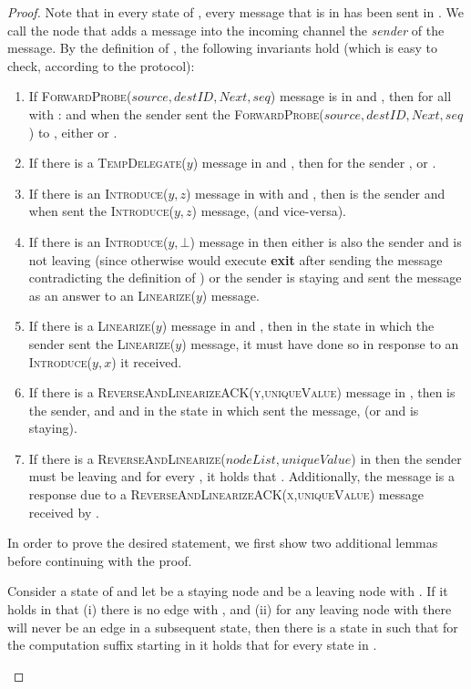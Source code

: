 \documentclass[a4paper,USenglish]{lipics}
\newcommand{\linearize}[1]{\textsc{Linearize(\ensuremath{#1})}\xspace}
\newcommand{\introduce}[1]{\textsc{Introduce(\ensuremath{#1})}\xspace}
\newcommand{\tempdelegate}[1]{\textsc{TempDelegate(\ensuremath{#1})}\xspace}
\newcommand{\forwardprobe}[1]{\textsc{ForwardProbe(\ensuremath{#1})}\xspace}
\newcommand{\revandlin}[1]{\textsc{ReverseAndLinearize(\ensuremath{#1})}\xspace} \newcommand{\revandlinREQ}[1]{\textsc{ReverseAndLinearizeREQ(#1)}\xspace}
\newcommand{\revandlinACK}[1]{\textsc{ReverseAndLinearizeACK(#1)}\xspace}
\begin{document}
\begin{proof}
  
  Note that in every state of , every message that is in   has been sent in .
  We call the node that adds a message into the incoming channel the \emph{sender} of the message.
  By the definition of , the following invariants hold (which is easy to check, according to the protocol):
  \begin{enumerate}
   \item If \forwardprobe{source,destID,Next,seq} message is in  and , then for all  with :  and when the sender  sent the \forwardprobe{source,destID,Next,seq} to , either  or .
   \item If there is a \tempdelegate{y} message in  and , then for the sender ,  or .
   \item If there is an \introduce{y,z} message in  with  and , then  is the sender and when  sent the \introduce{y,z} message,  (and vice-versa).
   \item If there is an \introduce{y,\bot} message in  then either  is also the sender and  is not leaving (since otherwise  would execute \textbf{exit} after sending the message contradicting the definition of ) or the sender  is staying and sent the message as an answer to an \linearize{y} message.
   \item If there is a \linearize{y} message in  and , then in the state in which the sender  sent the \linearize{y} message, it must have done so in response to an \introduce{y,x} it received.
   \item If there is a \revandlinACK{y,uniqueValue} message in , then  is the sender, and  and in the state in which  sent the message,  (or  and  is staying).
   \item If there is a \revandlin{nodeList,uniqueValue} in  then the sender  must be leaving and for every , it holds that . Additionally, the message is a response due to a \revandlinACK{x,uniqueValue} message received by .
  \end{enumerate}
In order to prove the desired statement, we first show two additional lemmas before continuing with the proof.

\begin{lemma}
\label{lem:staying_node_stops_pointing}
Consider a state  of  and let  be a staying node and  be a leaving node with . 
If it holds in  that (i) there is no edge  with , 
and (ii) for any leaving node  with  there will never be an edge  in a subsequent state, then there is a state  in  such that for the computation suffix  starting in  it holds that  for every state in .
\end{lemma}


\end{proof}
\end{document}
